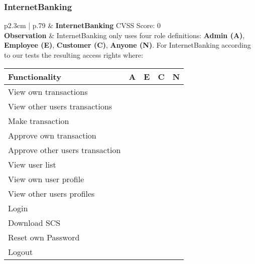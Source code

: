 \clearpage
\subsubsection{InternetBanking}
\begin{longtable}[l]{ p{2.3cm} | p{.79\linewidth} }\hline
    & \textbf{InternetBanking}
    \hfill CVSS Score: 0 
    \\ \hline
    \textbf{Observation} &
        InternetBanking only uses four role definitions: \textbf{Admin (A)}, \textbf{Employee (E)}, \textbf{Customer (C)}, \textbf{Anyone (N)}.
        For InternetBanking according to our tests the resulting access rights where:
        \begin{center}
            \begin{tabular}{ | l | l | l | l |}
            \hline
            \textbf{Functionality}          & \textbf{A} & \textbf{E} & \textbf{C} & \textbf{N} \\ \hline
            View own transactions           & \xmark    & \xmark    & \cmark    & \xmark \\ \hline
            View other users transactions   & \cmark    & \cmark    & \xmark    & \xmark \\ \hline
            Make transaction                & \xmark    & \xmark    & \cmark    & \xmark \\ \hline
            Approve own transaction         & \xmark    & \xmark    & \xmark    & \xmark \\ \hline
            Approve other users transaction & \cmark    & \cmark    & \xmark    & \xmark \\ \hline
            View user list                  & \cmark    & \cmark    & \xmark    & \xmark \\ \hline
            View own user profile           & \cmark    & \cmark    & \cmark    & \xmark \\ \hline
            View other users profiles       & \cmark    & \cmark    & \xmark    & \xmark \\ \hline
            Login                           & \cmark    & \cmark    & \cmark    & \xmark \\ \hline
            Download SCS                    & \cmark    & \cmark    & \cmark    & \xmark \\ \hline
            Reset own Password              & \cmark    & \cmark    & \cmark    & \xmark \\ \hline
            Logout                          & \cmark    & \cmark    & \cmark    & \xmark \\ \hline

\end{tabular}
\end{center}
\end{longtable}
